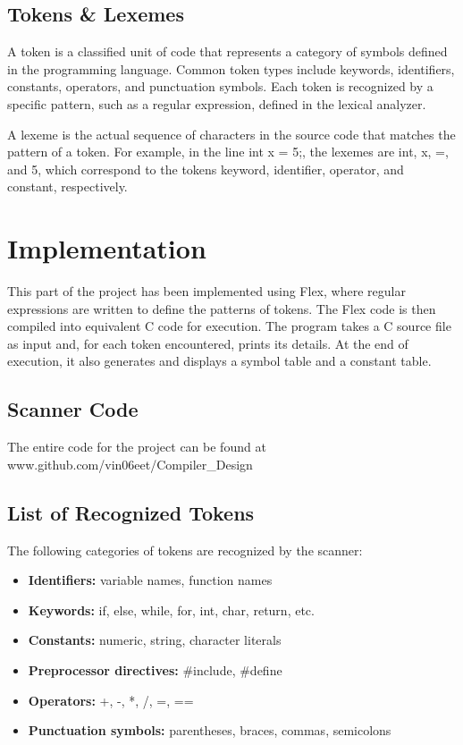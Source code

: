 \documentclass[12pt]{article}
\begin{document}
\subsection{Tokens \& Lexemes}
A token is a classified unit of code that represents a category of symbols defined in the programming language. Common token types include keywords, identifiers, constants, operators, and punctuation symbols. Each token is recognized by a specific pattern, such as a regular expression, defined in the lexical analyzer.

A lexeme is the actual sequence of characters in the source code that matches the pattern of a token. For example, in the line int x = 5;, the lexemes are int, x, =, and 5, which correspond to the tokens keyword, identifier, operator, and constant, respectively.

\section{Implementation}
This part of the project has been implemented using Flex, where regular expressions are written to define the patterns of tokens. The Flex code is then compiled into equivalent C code for execution. The program takes a C source file as input and, for each token encountered, prints its details. At the end of execution, it also generates and displays a symbol table and a constant table.

\subsection{Scanner Code}
The entire code for the project can be found at www.github.com/vin06eet/Compiler\_Design 


\subsection{List of Recognized Tokens}
The following categories of tokens are recognized by the scanner:
\begin{itemize}
    \item \textbf{Identifiers: } variable names, function names
    \item \textbf{Keywords: } if, else, while, for, int, char, return, etc.
    \item \textbf{Constants: } numeric, string, character literals
    \item \textbf{Preprocessor directives: } \#include, \#define
    \item \textbf{Operators: } +, -, *, /, =, ==
    \item \textbf{Punctuation symbols: } parentheses, braces, commas, semicolons
\end{itemize}
\end{document}
